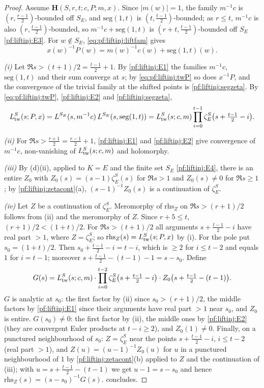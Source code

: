 \begin{proof}
Assume $\mathbf H(S,r,t;c,P;m,x)$. Since $|m(w)|=1$, the family $m^{-1}c$ is $(r,\frac{r-1}2)$-bounded off $S_E$,
and $\mathrm{seg}(1,t)$ is $(t,\frac{t-1}2)$-bounded; as $r\le t$, $m^{-1}c$ is also $(r,\frac{t-1}2)$-bounded, so
$m^{-1}c+\mathrm{seg}(1,t)$ is $(r+t,\frac{t-1}2)$-bounded off $S_E$ \ref{pf:liftinj:E3}. For $w\notin S_E$,
\eqref{eq:pf:liftinj:liftfam} gives
\begin{equation}\label{eq:pf:liftinj:twP}
x(w)^{-1}P(w)=m(w)^{-1}c(w)+\mathrm{seg}(1,t)(w).
\end{equation}

\emph{(i)} Let $\Re s>(t+1)/2=\frac{t-1}2+1$. By \ref{pf:liftinj:E1} the families $m^{-1}c$, $\mathrm{seg}(1,t)$
and their sum converge at $s$; by \eqref{eq:pf:liftinj:twP} so does $x^{-1}P$, and the convergence of the trivial
family at the shifted points is \cref{pf:liftinj:segzeta}. By \eqref{eq:pf:liftinj:twP}, \ref{pf:liftinj:E2} and
\cref{pf:liftinj:segzeta},
\[
L^{S}_{\mathrm{tw}}(s;P,x)=L^{S_E}(s,m^{-1}c)\,L^{S_E}(s,\mathrm{seg}(1,t))
=L^{S}_{\mathrm{tw}}(s;c,m)\prod_{i=0}^{t-1}\zeta^S_E\bigl(s+\tfrac{t-1}2-i\bigr).
\]

\emph{(ii)} For $\Re s>\frac{r+1}2=\frac{r-1}2+1$, \ref{pf:liftinj:E1} and \ref{pf:liftinj:E2} give convergence of
$m^{-1}c$, non-vanishing of $L^{S}_{\mathrm{tw}}(s;c,m)$ and holomorphy.

\emph{(iii)} By (d)(ii), applied to $K=E$ and the finite set $S_E$ \ref{pf:liftinj:E4}, there is an entire $Z_0$
with $Z_0(s)=(s-1)\zeta^S_E(s)$ for $\Re s>1$ and $Z_0(s)\ne0$ for $\Re s\ge1$; by
\cref{pf:liftinj:zetacont}(a), $(s-1)^{-1}Z_0(s)$ is a continuation of $\zeta^S_E$.

\emph{(iv)} Let $Z$ be a continuation of $\zeta^S_E$. Meromorphy of $\mathrm{rhs}_Z$ on $\Re s>(r+1)/2$ follows from
(ii) and the meromorphy of $Z$. Since $r+5\le t$, $(r+1)/2<(1+t)/2$. For $\Re s>(t+1)/2$ all arguments
$s+\frac{t-1}2-i$ have real part $>1$, where $Z=\zeta^S_E$; so $\mathrm{rhs}_Z(s)=L^{S}_{\mathrm{tw}}(s;P,x)$ by (i).
For the pole put $s_0=(1+t)/2$. Then $s_0+\frac{t-1}2-i=t-i$, which is $\ge2$ for $i\le t-2$ and equals $1$ for
$i=t-1$; moreover $s+\frac{t-1}2-(t-1)-1=s-s_0$. Define
\[
G(s)=L^{S}_{\mathrm{tw}}(s;c,m)\cdot\prod_{i=0}^{t-2}\zeta^S_E\bigl(s+\tfrac{t-1}2-i\bigr)\cdot
Z_0\bigl(s+\tfrac{t-1}2-(t-1)\bigr).
\]
$G$ is analytic at $s_0$: the first factor by (ii) since $s_0>(r+1)/2$, the middle factors by \ref{pf:liftinj:E1}
since their arguments have real part $>1$ near $s_0$, and $Z_0$ is entire. $G(s_0)\ne0$: the first factor by
(ii), the middle ones by \ref{pf:liftinj:E2} (they are convergent Euler products at $t-i\ge2$), and
$Z_0(1)\ne0$. Finally, on a punctured neighbourhood of $s_0$: $Z=\zeta^S_E$ near the points $s+\frac{t-1}2-i$,
$i\le t-2$ (real part $>1$), and $Z(u)=(u-1)^{-1}Z_0(u)$ for $u$ in a punctured neighbourhood of $1$ by
\cref{pf:liftinj:zetacont}(b) applied to $Z$ and the continuation of (iii); with $u=s+\frac{t-1}2-(t-1)$ we get
$u-1=s-s_0$ and hence $\mathrm{rhs}_Z(s)=(s-s_0)^{-1}G(s)$.  concludes.
\end{proof}


